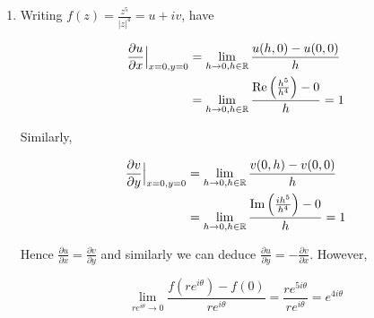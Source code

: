 \documentclass[a4paper]{article}
\begin{document}
\begin{enumerate}
%	
%	
%	
% 	

	\item Writing $ f(z) = \frac{z^{5}}{| z |^{4}} = u + iv $, have
	
	
	\begin{align*}
	\frac{\partial u }{\partial x} \Big|_{x=0,y=0} & = \lim_{h \to 0, h \in \mathbb{R}} \frac{u(h,0) - u(0,0)}{h}  \\
	& = \lim_{h \to 0, h \in \mathbb{R}} \frac{\operatorname{Re}\left(  \frac{h^{5}}{h^{4}} \right) - 0 }{h} = 1
	\end{align*}
	
	Similarly,
	
	\begin{align*}
	\frac{\partial v }{\partial y} \Big|_{x=0,y=0} & = \lim_{h \to 0, h \in \mathbb{R}} \frac{v(0,h) - v(0,0)}{h}  \\
	& = \lim_{h \to 0, h \in \mathbb{R}} \frac{\operatorname{Im} \left(  \frac{ih^{5}}{h^{4}} \right) - 0 }{h} = 1
	\end{align*}
	
	Hence $ \frac{\partial u }{\partial x} = \frac{\partial v}{\partial y} $ and similarly we can deduce $ \frac{\partial u}{\partial y} = - \frac{\partial v }{\partial x} $. However,
	
	\[ \lim\limits_{re^{i \theta} \to 0} \frac{f(re^{i \theta}) - f(0) }{r e^{i \theta}} = \frac{r e^{5 i \theta}}{r e^{i \theta}} = e^{4 i \theta} \]
	

\end{enumerate}
\end{document}
